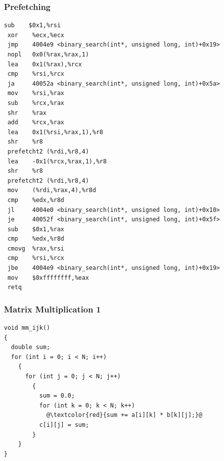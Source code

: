 \documentclass{beamer}
\newcounter{exo}
\newcommand{\exo}{
  \addtocounter{exo}{1}
  Exercice \arabic{exo}
}
\begin{document}
\begin{frame}[fragile]
\frametitle{Prefetching}
\tiny

\begin{lstlisting}[linebackgroundcolor={\lstcolorlines{14, 17}}]
 sub    $0x1,%rsi
 xor    %ecx,%ecx
 jmp    4004e9 <binary_search(int*, unsigned long, int)+0x19>
 nopl   0x0(%rax,%rax,1)
 lea    0x1(%rax),%rcx
 cmp    %rsi,%rcx
 ja     40052a <binary_search(int*, unsigned long, int)+0x5a>
 mov    %rsi,%rax
 sub    %rcx,%rax
 shr    %rax
 add    %rcx,%rax
 lea    0x1(%rsi,%rax,1),%r8
 shr    %r8
 prefetcht2 (%rdi,%r8,4)
 lea    -0x1(%rcx,%rax,1),%r8
 shr    %r8
 prefetcht2 (%rdi,%r8,4)
 mov    (%rdi,%rax,4),%r8d
 cmp    %edx,%r8d
 jl     4004e0 <binary_search(int*, unsigned long, int)+0x10>
 je     40052f <binary_search(int*, unsigned long, int)+0x5f>
 sub    $0x1,%rax
 cmp    %edx,%r8d
 cmovg  %rax,%rsi
 cmp    %rsi,%rcx
 jbe    4004e9 <binary_search(int*, unsigned long, int)+0x19>
 mov    $0xffffffff,%eax
 retq
\end{lstlisting}

\end{frame}


\lstset{language = c++, frameround = fttt, frame=trBL}

\begin{frame}[fragile]
\frametitle{Matrix Multiplication 1}
\scriptsize

\begin{lstlisting}
void mm_ijk()
{
  double sum;
  for (int i = 0; i < N; i++)
    {
      for (int j = 0; j < N; j++)
        {
          sum = 0.0;
          for (int k = 0; k < N; k++)
            @\textcolor{red}{sum += a[i][k] * b[k][j];}@
          c[i][j] = sum;
        }
    }
}
\end{lstlisting}

\end{frame}
\end{document}

